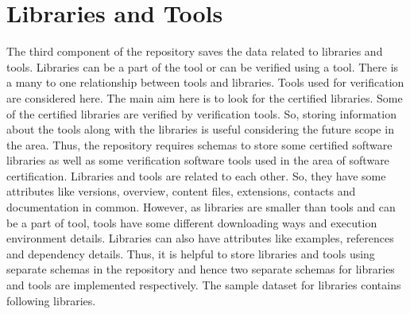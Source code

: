 \documentclass[11pt,letterpaper]{report}
\begin{document}
\chapter{Libraries and Tools}
The third component of the repository saves the data related to libraries and tools. Libraries can be a part of the tool or can be verified using a tool. There is a many to one relationship between tools and libraries. Tools used for verification are considered here. The main aim here is to look for the certified libraries. Some of the certified libraries are verified by verification tools. So, storing information about the tools along with the libraries is useful considering the future scope in the area. Thus, the repository requires schemas to store some certified software libraries as well as some verification software tools used in the area of software certification. Libraries and tools are related to each other. So, they have some attributes like versions, overview, content files, extensions, contacts and documentation in common. However, as libraries are smaller than tools and can be a part of tool, tools have some different downloading ways and execution environment details. Libraries can also have attributes like examples, references and dependency details. Thus, it is helpful to store libraries and tools using separate schemas in the repository and hence two separate schemas for libraries and tools are implemented respectively.   
The sample dataset for libraries contains following libraries. 
\end{document}
